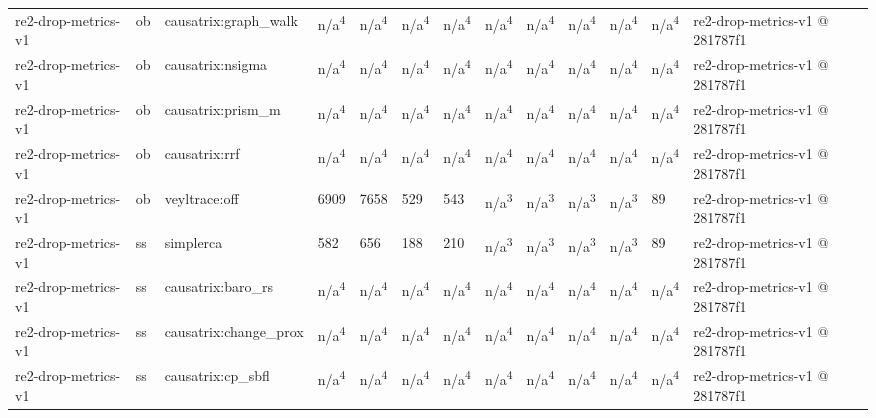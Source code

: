 \begin{table}[t]
\begin{tabular}{lllllllllllll}
re2-drop-metrics-v1 & ob & causatrix:graph\_walk & n/a\textsuperscript{4} & n/a\textsuperscript{4} & n/a\textsuperscript{4} & n/a\textsuperscript{4} & n/a\textsuperscript{4} & n/a\textsuperscript{4} & n/a\textsuperscript{4} & n/a\textsuperscript{4} & n/a\textsuperscript{4} & re2-drop-metrics-v1 @ 281787f1 \\
re2-drop-metrics-v1 & ob & causatrix:nsigma & n/a\textsuperscript{4} & n/a\textsuperscript{4} & n/a\textsuperscript{4} & n/a\textsuperscript{4} & n/a\textsuperscript{4} & n/a\textsuperscript{4} & n/a\textsuperscript{4} & n/a\textsuperscript{4} & n/a\textsuperscript{4} & re2-drop-metrics-v1 @ 281787f1 \\
re2-drop-metrics-v1 & ob & causatrix:prism\_m & n/a\textsuperscript{4} & n/a\textsuperscript{4} & n/a\textsuperscript{4} & n/a\textsuperscript{4} & n/a\textsuperscript{4} & n/a\textsuperscript{4} & n/a\textsuperscript{4} & n/a\textsuperscript{4} & n/a\textsuperscript{4} & re2-drop-metrics-v1 @ 281787f1 \\
re2-drop-metrics-v1 & ob & causatrix:rrf & n/a\textsuperscript{4} & n/a\textsuperscript{4} & n/a\textsuperscript{4} & n/a\textsuperscript{4} & n/a\textsuperscript{4} & n/a\textsuperscript{4} & n/a\textsuperscript{4} & n/a\textsuperscript{4} & n/a\textsuperscript{4} & re2-drop-metrics-v1 @ 281787f1 \\
re2-drop-metrics-v1 & ob & veyltrace:off & 6909 & 7658 & 529 & 543 & n/a\textsuperscript{3} & n/a\textsuperscript{3} & n/a\textsuperscript{3} & n/a\textsuperscript{3} & 89 & re2-drop-metrics-v1 @ 281787f1 \\
re2-drop-metrics-v1 & ss & simplerca & 582 & 656 & 188 & 210 & n/a\textsuperscript{3} & n/a\textsuperscript{3} & n/a\textsuperscript{3} & n/a\textsuperscript{3} & 89 & re2-drop-metrics-v1 @ 281787f1 \\
re2-drop-metrics-v1 & ss & causatrix:baro\_rs & n/a\textsuperscript{4} & n/a\textsuperscript{4} & n/a\textsuperscript{4} & n/a\textsuperscript{4} & n/a\textsuperscript{4} & n/a\textsuperscript{4} & n/a\textsuperscript{4} & n/a\textsuperscript{4} & n/a\textsuperscript{4} & re2-drop-metrics-v1 @ 281787f1 \\
re2-drop-metrics-v1 & ss & causatrix:change\_prox & n/a\textsuperscript{4} & n/a\textsuperscript{4} & n/a\textsuperscript{4} & n/a\textsuperscript{4} & n/a\textsuperscript{4} & n/a\textsuperscript{4} & n/a\textsuperscript{4} & n/a\textsuperscript{4} & n/a\textsuperscript{4} & re2-drop-metrics-v1 @ 281787f1 \\
re2-drop-metrics-v1 & ss & causatrix:cp\_sbfl & n/a\textsuperscript{4} & n/a\textsuperscript{4} & n/a\textsuperscript{4} & n/a\textsuperscript{4} & n/a\textsuperscript{4} & n/a\textsuperscript{4} & n/a\textsuperscript{4} & n/a\textsuperscript{4} & n/a\textsuperscript{4} & re2-drop-metrics-v1 @ 281787f1 \\

\end{tabular}
\end{table}
